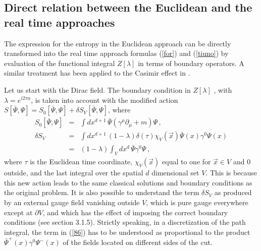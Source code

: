 \documentclass[11pt]{article}
\def\nn{\nonumber}
\begin{document}
\subsection{Direct relation between the Euclidean and the real time approaches}
The expression for the entropy in the Euclidean approach can be directly transformed into the real time approach formulas (\ref{for}) and (\ref{tiuno}) by evaluation of the functional integral $ Z[\lambda]$ in terms of boundary operators. A similar treatment has been applied to the Casimir effect in \cite{fos}. 


Let us start with the Dirac field. The boundary condition in $Z[\lambda]$ , with $\lambda=e^{i 2 \pi a}$, is taken into account with the modified action $S[\bar{\Psi},\Psi]=S_0[\bar{\Psi},\Psi]+\delta S_V[\bar{\Psi},\Psi]$, where 
\begin{eqnarray}
S_0[\bar{\Psi},\Psi]&=&\int dx^{d+1}\,\bar{\Psi} (\gamma^\mu \partial_\mu + m) \Psi \,,\nn\\
\delta S_V&=& \int dx^{d+1}\, (1-\lambda) \delta(\tau)\chi_V(\vec{x}) \bar{\Psi}(x) \gamma^0\Psi(x)\nn\\
&=& (1-\lambda) \int_V dx^d\, \bar{\Psi}\gamma^0 \Psi \,,
\label{86}
\end{eqnarray}
where $\tau$ is the Euclidean time coordinate,  $\chi_V(\vec{x})$ equal to one for $\vec{x}\in V$ and $0$ outside, and the last integral over the spatial $d$ dimensional set $V$.  This is because this new action leads to the same classical solutions and boundary conditions as the original problem. It is also possible to understand the term $\delta S_V$ as produced by an external gauge field vanishing outside  $V$, which is pure gauge everywhere except at $\partial V$, and which has the effect of imposing the correct boundary conditions (see section 3.1.5).
Strictly speaking, in a discretization of the path integral, the term in (\ref{86}) has to be understood as proportional to the product $\bar{\Psi}^+(x) \gamma^0\Psi^-(x)$ of the fields located on different sides of the cut. 
\end{document}
